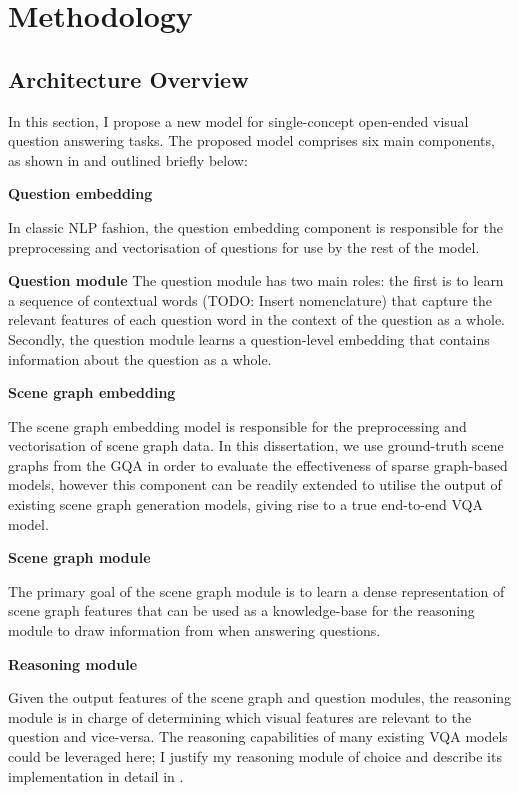 \chapter{Methodology}
\label{chapter:methodology}

\section{Architecture Overview}
\label{section:architecture_overview}

In this section, I propose a new model for single-concept open-ended visual question answering tasks. The proposed model comprises six main components, as shown in \figureautorefname{ \ref{fig:model_overview}} and outlined briefly below:

\textbf{Question embedding}

In classic NLP fashion, the question embedding component is responsible for the preprocessing and vectorisation of questions for use by the rest of the model.

\textbf{Question module}
The question module has two main roles: the first is to learn a sequence of contextual words {\color{red}(TODO: Insert nomenclature)} that capture the relevant features of each question word in the context of the question as a whole. Secondly, the question module learns a question-level embedding that contains information about the question as a whole.

\textbf{Scene graph embedding}

The scene graph embedding model is responsible for the preprocessing and vectorisation of scene graph data. In this dissertation, we use ground-truth scene graphs from the GQA in order to evaluate the effectiveness of sparse graph-based models, however this component can be readily extended to utilise the output of existing scene graph generation models, giving rise to a true end-to-end VQA model.

\textbf{Scene graph module}

The primary goal of the scene graph module is to learn a dense representation of scene graph features that can be used as a knowledge-base for the reasoning module to draw information from when answering questions.

\textbf{Reasoning module}

Given the output features of the scene graph and question modules, the reasoning module is in charge of determining which visual features are relevant to the question and vice-versa. The reasoning capabilities of many existing VQA models could be leveraged here; I justify my reasoning module of choice and describe its implementation in detail in \sectionautorefname{ \ref{section:reasoning_module}}.

